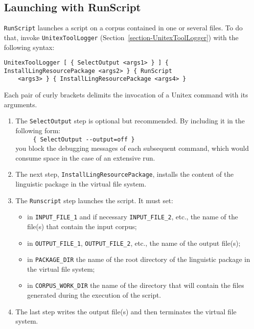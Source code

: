 \subsection{Launching with RunScript}
\label{section-runscript}
\verb$RunScript$ launches a script on a corpus contained in one or several files.
To do that, invoke \verb$UnitexToolLogger$ (Section~\ref{section-UnitexToolLogger})
with the following syntax:

\begin{Verbatim}[fontsize=\small,fontfamily=helvetica]
UnitexToolLogger [ { SelectOutput <args1> } ] { InstallLingResourcePackage <args2> } { RunScript
    <args3> } { InstallLingResourcePackage <args4> }
\end{Verbatim}

\noindent Each pair of curly brackets delimits the invocation of a Unitex command with its arguments.

\begin{enumerate}
\item The \verb$SelectOutput$ step is optional but recommended. By including it in the following form:
\\
\verb$     { SelectOutput --output=off }$\\
you block the debugging messages of each subsequent command, which would consume space in the case of an extensive run.
\item The next step, \verb$InstallLingResourcePackage$, installs the content of the linguistic package
in the virtual file system.
\item The \verb$Runscript$ step launches the script. It must set:
   \begin{itemize}
   \item in \verb$INPUT_FILE_1$ and if necessary \verb$INPUT_FILE_2$, etc., the name of the
   file(s) that contain the input corpus;
   \item in \verb$OUTPUT_FILE_1$, \verb$OUTPUT_FILE_2$, etc., the name of the output file(s);
   \item in \verb$PACKAGE_DIR$ the name of the root directory of the linguistic package in the virtual
file system;
   \item in \verb$CORPUS_WORK_DIR$ the name of the directory that will contain the files
generated during the execution of the script.
   \end{itemize}
\item The last step writes the output file(s) and then terminates the virtual file system.
\end{enumerate}

